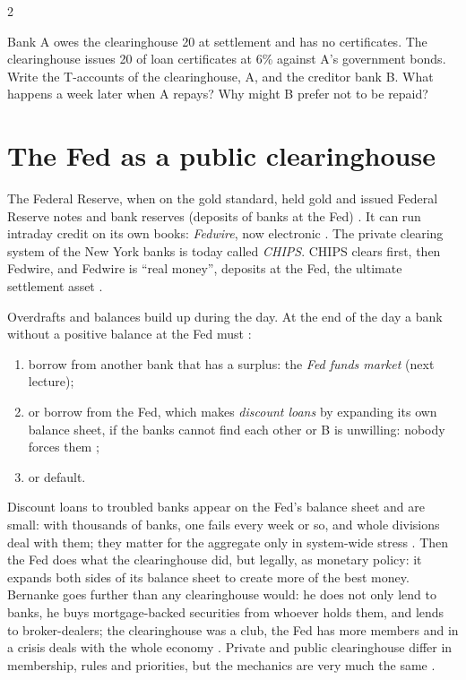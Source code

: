 \begin{paracol}{2}
\begin{exercise}
Bank A owes the clearinghouse 20 at settlement and has no certificates. The clearinghouse issues 20 of loan certificates at 6\% against A's government bonds.
Write the T-accounts of the clearinghouse, A, and the creditor bank B. What happens a week later when A repays? Why might B prefer not to be repaid?
\end{exercise}

\section{The Fed as a public clearinghouse}\label{sec:ch-fed}

The Federal Reserve, when on the gold standard, held gold and issued Federal Reserve notes and bank reserves (deposits of banks at the Fed)
. It can run intraday credit on its own books: \emph{Fedwire}, now electronic . The private clearing system
of the New York banks is today called \emph{CHIPS}. CHIPS clears first, then Fedwire, and Fedwire is ``real money'', deposits at the Fed, the ultimate
settlement asset .
\begin{taccts}
\end{taccts}
Overdrafts and balances build up during the day. At the end of the day a bank without a positive balance at the Fed must :
\begin{enumerate}
  \item borrow from another bank that has a surplus: the \emph{Fed funds market} (next lecture);
  \item or borrow from the Fed, which makes \emph{discount loans} by expanding its own balance sheet, if the banks cannot find each other or B is
        unwilling: nobody forces them ;
  \item or default.
\end{enumerate}
Discount loans to troubled banks appear on the Fed's balance sheet and are small: with thousands of banks, one fails every week or so, and whole
divisions deal with them; they matter for the aggregate only in system-wide stress . Then the Fed does what the
clearinghouse did, but legally, as monetary policy: it expands both sides of its balance sheet to create more of the best money. Bernanke goes further than
any clearinghouse would: he does not only lend to banks, he buys mortgage-backed securities from whoever holds them, and lends to broker-dealers; the
clearinghouse was a club, the Fed has more members and in a crisis deals with the whole economy .
Private and public clearinghouse differ in membership, rules and priorities, but the mechanics are very much the same .


\end{paracol}
